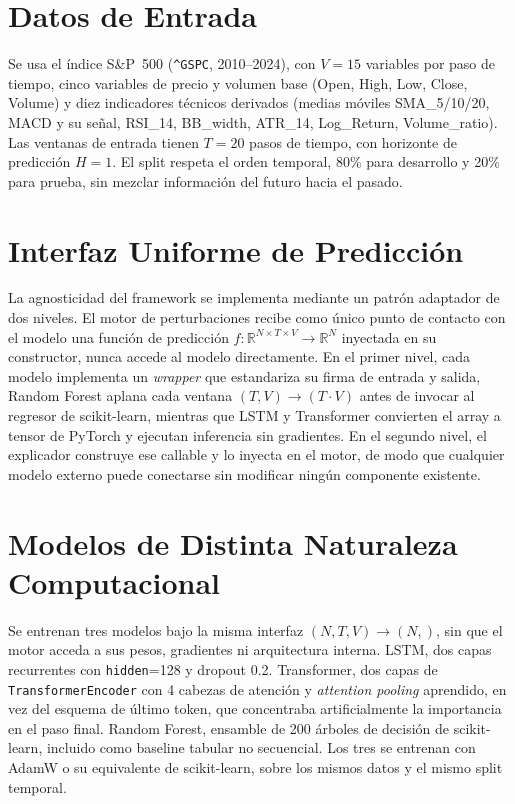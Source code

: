 \section{Datos de Entrada}

Se usa el índice S\&P~500 (\texttt{\^{}GSPC}, 2010--2024), con $V=15$ variables por paso de tiempo, cinco variables de precio y volumen base (Open, High, Low, Close, Volume) y diez indicadores técnicos derivados (medias móviles SMA\_5/10/20, MACD y su señal, RSI\_14, BB\_width, ATR\_14, Log\_Return, Volume\_ratio). Las ventanas de entrada tienen $T=20$ pasos de tiempo, con horizonte de predicción $H=1$. El split respeta el orden temporal, 80\% para desarrollo y 20\% para prueba, sin mezclar información del futuro hacia el pasado.

\section{Interfaz Uniforme de Predicción}

La agnosticidad del framework se implementa mediante un patrón adaptador de dos niveles. El motor de perturbaciones recibe como único punto de contacto con el modelo una función de predicción $f: \mathbb{R}^{N \times T \times V} \rightarrow \mathbb{R}^N$ inyectada en su constructor, nunca accede al modelo directamente. En el primer nivel, cada modelo implementa un \emph{wrapper} que estandariza su firma de entrada y salida, Random Forest aplana cada ventana $(T,V) \rightarrow (T{\cdot}V)$ antes de invocar al regresor de scikit-learn, mientras que LSTM y Transformer convierten el array a tensor de PyTorch y ejecutan inferencia sin gradientes. En el segundo nivel, el explicador construye ese callable y lo inyecta en el motor, de modo que cualquier modelo externo puede conectarse sin modificar ningún componente existente.

\section{Modelos de Distinta Naturaleza Computacional}

Se entrenan tres modelos bajo la misma interfaz $(N,T,V) \rightarrow (N,)$, sin que el motor acceda a sus pesos, gradientes ni arquitectura interna. LSTM, dos capas recurrentes con \texttt{hidden}=128 y dropout 0.2. Transformer, dos capas de \texttt{TransformerEncoder} con 4 cabezas de atención y \emph{attention pooling} aprendido, en vez del esquema de último token, que concentraba artificialmente la importancia en el paso final. Random Forest, ensamble de 200 árboles de decisión de scikit-learn, incluido como baseline tabular no secuencial. Los tres se entrenan con AdamW o su equivalente de scikit-learn, sobre los mismos datos y el mismo split temporal.

